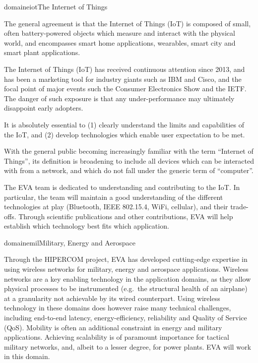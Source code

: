 \documentclass{ra2016}
\begin{document}
\begin{module}{domaine}{iot}{The Internet of Things}

The general agreement is that the Internet of Things (IoT) is composed of small, often battery-powered objects which measure and interact with the physical world, and encompasses smart home applications, wearables, smart city and smart plant applications.

The Internet of Things (IoT) has received continuous attention since 2013, and has been a marketing tool for industry giants such as IBM and Cisco, and the focal point of major events such the Consumer Electronics Show and the IETF.
The danger of such exposure is that any under-performance may ultimately disappoint early adopters.

It is absolutely essential to (1) clearly understand the limits and capabilities of the IoT, and (2) develop technologies which enable user expectation to be met.

With the general public becoming increasingly familiar with the term ``Internet of Things'', its definition is broadening to include all devices which can be interacted with from a network, and which do not fall under the generic term of ``computer''.

The EVA team is dedicated to understanding and contributing to the IoT.
In particular, the team will maintain a good understanding of the different technologies at play (Bluetooth, IEEE 802.15.4, WiFi, cellular), and their trade-offs.
Through scientific publications and other contributions, EVA will help establish which technology best fits which application.

\end{module}

\begin{module}{domaine}{mil}{Military, Energy and Aerospace}

Through the HIPERCOM project, EVA has developed cutting-edge expertise in using wireless networks for military, energy and aerospace applications. 
Wireless networks are a key enabling technology in the application domains, as they allow physical processes to be instrumented (e.g.~the structural health of an airplane) at a granularity not achievable by its wired counterpart.
Using wireless technology in these domains does however raise many technical challenges, including end-to-end latency, energy-efficiency, reliability and Quality of Service (QoS).
Mobility is often an additional constraint in energy and military applications.
Achieving scalability is of paramount importance for tactical military networks, and, albeit to a lesser degree, for power plants.
EVA will work in this domain.

\end{module}
\end{document}
